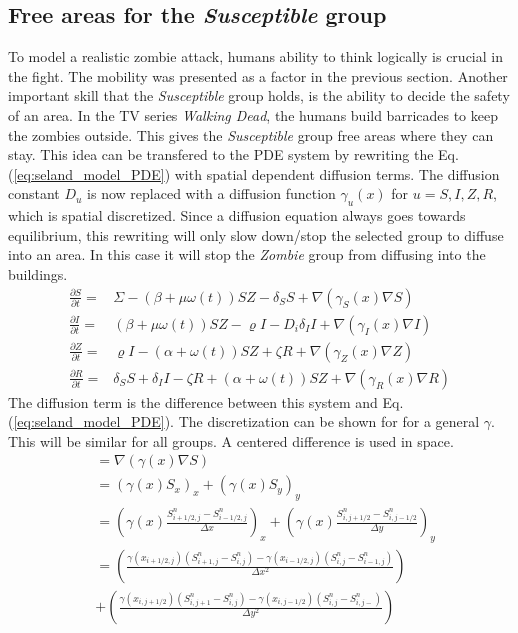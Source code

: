 \documentclass[%
twoside,                 %
final,                   %
chapterprefix=true,      %
open=right               %
10pt]{book}
\begin{document}
\subsection{Free areas for the \emph{Susceptible} group}
To model a realistic zombie attack, humans ability to think logically is crucial in the fight. The mobility was presented as a factor in the previous section. Another important skill that the \emph{Susceptible} group holds, is the ability to decide the safety of an area. In the TV series \emph{Walking Dead}, the humans build barricades to keep the zombies outside. This gives the \emph{Susceptible} group free areas where they can stay. This idea can be transfered to the PDE system by rewriting the Eq.(\ref{eq:seland_model_PDE}) with spatial dependent diffusion terms. The diffusion constant $D_u$ is now replaced with a diffusion function $\gamma_u(x)$ for $u= S,I,Z,R$, which is spatial discretized. Since a diffusion equation always goes towards equilibrium, this rewriting will only slow down/stop the selected group to diffuse into an area. In this case it will stop the \emph{Zombie} group from diffusing into the buildings. 
\begin{equation} \label{eq:seland_model_diff}
    \begin{aligned} 
    \frac{\partial S}{\partial t} =& \Sigma -(\beta+\mu \omega(t))SZ - \delta_SS +\nabla(\gamma_S(x) \nabla S) \\
    \frac{\partial I}{\partial t} =& (\beta+\mu \omega(t))SZ - \varrho I - D_i\delta_II+\nabla(\gamma_I(x) \nabla I)\\
    \frac{\partial Z}{\partial t} =& \varrho I- (\alpha+\omega(t))SZ + \zeta R+\nabla(\gamma_Z(x) \nabla Z)\\
    \frac{\partial R}{\partial t} =& \delta_SS +\delta_II -\zeta R + (\alpha+\omega(t))SZ+\nabla(\gamma_R(x) \nabla R) 
    \end{aligned}
\end{equation}
The diffusion term is the difference between this system and Eq.(\ref{eq:seland_model_PDE}). The discretization can be shown for for a general $\gamma$. This will be similar for all groups. A centered difference is used in space.
\begin{equation} \label{eq:gamma}
    \begin{aligned}
    &=\nabla(\gamma(x) \nabla S) \\
    &=(\gamma(x) S_x)_x+(\gamma(x) S_y)_y \\
    &= \left(\gamma(x) \frac{S^{n}_{i+1/2,j}-S^{n}_{i-1/2,j}}{\Delta x}\right)_x+\left(\gamma(x) \frac{S^{n}_{i,j+1/2}-S^{n}_{i,j-1/2}}{\Delta y}\right)_y \\
    &= \left(\frac{\gamma(x_{i+1/2,j})(S^{n}_{i+1,j}-S^{n}_{i,j})-\gamma(x_{i-1/2,j})(S^{n}_{i,j}-S^{n}_{i-1,j})}{\Delta x^2}\right) \\
    &+ \left(\frac{\gamma(x_{i,j+1/2})(S^{n}_{i,j+1}-S^{n}_{i,j})-\gamma(x_{i,j-1/2})(S^{n}_{i,j}-S^{n}_{i,j-})}{\Delta y^2}\right)
    \end{aligned}
\end{equation}
\end{document}
